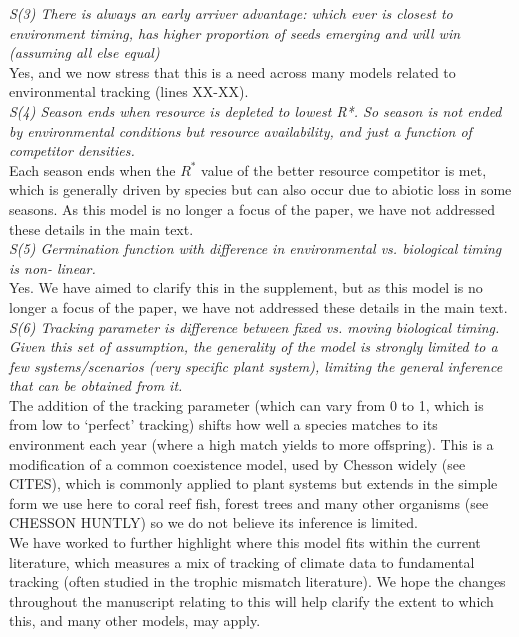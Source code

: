 \documentclass[11pt]{article}
\begin{document}
\emph{S(3)     There is always an early arriver advantage: which ever is closest to environment
timing, has higher proportion of seeds emerging and will win (assuming all else equal)}\\

Yes, and we now stress that this is a need across many models related to environmental tracking (lines XX-XX).\\

\emph{S(4)     Season ends when resource is depleted to lowest R*. So season is not ended by
environmental conditions but resource availability, and just a function of competitor
densities.}\\

Each season ends when the $R^*$ value of the better resource competitor is met, which is generally driven by species but can also occur due to abiotic loss in some seasons. As this model is no longer a focus of the paper, we have not addressed these details in the main text.\\

\emph{S(5)     Germination function with difference in environmental vs. biological timing is non-
linear.}\\

Yes. We have aimed to clarify this in the supplement, but as this model is no longer a focus of the paper, we have not addressed these details in the main text.\\

\emph{S(6)     Tracking parameter is difference between fixed vs. moving biological timing.
Given this set of assumption, the generality of the model is strongly limited to a few
systems/scenarios (very specific plant system), limiting the general inference that can be
obtained from it.}\\

The addition of the tracking parameter (which can vary from 0 to 1, which is from low to `perfect' tracking) shifts how well a species matches to its environment each year (where a high match yields to more offspring). This is a modification of a common coexistence model, used by Chesson widely (see CITES), which is commonly applied to plant systems but extends in the simple form we use here to coral reef fish, forest trees and many other organisms (see CHESSON HUNTLY) so we do not believe its inference is limited.\\

We have worked to further highlight where this model fits within the current literature, which measures a mix of tracking of climate data to fundamental tracking (often studied in the trophic mismatch literature). We hope the changes throughout the manuscript relating to this will help clarify the extent to which this, and many other models, may apply.\\
\end{document}
